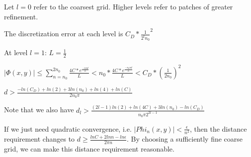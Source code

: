 \documentclass[12pt]{article}
\begin{document}
Let $l = 0$ refer to the coarsest grid.  Higher levels refer to patches of greater refinement. 

The discretization error at each level is $C_D * \frac{1}{2^l n_0}^2$


At level $l = 1$:
$L = \frac{1}{2}$

$|\Phi(x, y)| \leq \sum_{n=n_0}^{2n_0} \frac{4C * e^\frac{-n \pi d}{L}}{L} < n_0 *\frac{4C * e^\frac{-n_0 \pi d}{L}}{L} <  C_D * (\frac{1}{2 n_0})^2$

$d > \frac{-ln(C_D) + ln(2) + 3 ln(n_0) + ln(4) + ln(C)}{2 n_0 \pi} $ 

Note that we also have $d_l > \frac{(2l-1)ln(2) + ln(4C) + 3ln(n_0) - ln(C_D)}{n_0 \pi 2^{2l-1}}$










If we just need quadratic convergence, i.e. $|Phi_n(x, y)| < \frac{\epsilon}{n^2}$, then the distance requirement changes to $d \geq \frac{lnC + 2lnn - ln\epsilon}{2 \pi n}$. By choosing a sufficiently fine coarse grid, we can make this distance requirement reasonable. 



    


\end{document}
